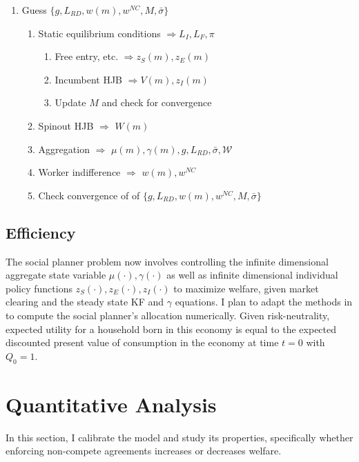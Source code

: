 \documentclass[11pt,english]{article}
\theoremstyle{remark}
\begin{document}
\begin{enumerate}
	\item Guess $\{g, L_{RD}, w(m), w^{NC}, M, \bar{\sigma} \}$
	\begin{enumerate}
		\item Static equilibrium conditions $\Rightarrow L_I,L_F,\pi$
		\begin{enumerate}
			\item Free entry, etc. $\Rightarrow z_S(m), z_E(m)$
			\item Incumbent HJB $\Rightarrow  V(m),z_I(m)$ 
			\item Update $M$ and check for convergence
		\end{enumerate}
		\item Spinout HJB $\Rightarrow$ $W(m)$
		\item Aggregation $\Rightarrow$ $\mu(m),\gamma(m),g,L_{RD},\bar{\sigma},\mathcal{W}$
		\item Worker indifference $\Rightarrow$ $w(m),w^{NC}$
		\item Check convergence of of $\{g, L_{RD}, w(m), w^{NC}, M, \bar{\sigma} \}$
	\end{enumerate}
\end{enumerate}


\subsection{Efficiency}

The social planner problem now involves controlling the infinite dimensional aggregate state variable $\mu(\cdot), \gamma(\cdot)$ as well as infinite dimensional individual policy functions $z_S(\cdot),z_E(\cdot),z_I(\cdot)$ to maximize welfare, given market clearing and the steady state KF and $\gamma$ equations. I plan to adapt the methods in \cite{nuno_social_2018} to compute the social planner's allocation numerically. Given risk-neutrality, expected utility for a household born in this economy is equal to the expected discounted present value of consumption in the economy at time $t = 0$ with $Q_0 = 1$. 

\section{Quantitative Analysis}

In this section, I calibrate the model and study its properties, specifically whether enforcing non-compete agreements increases or decreases welfare. 
\end{document}
